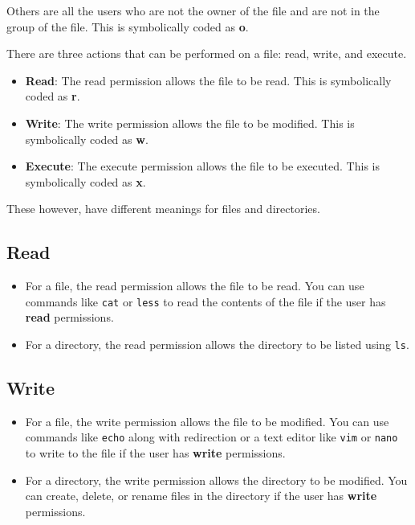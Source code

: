 \begin{definition}[Others]
  Others are all the users who are not the owner of the file and are not in the group of the file.
  This is symbolically coded as \textbf{o}.
\end{definition}

There are three actions that can be performed on a file: read, write, and execute.

\begin{itemize}
  \item \textbf{Read}: The read permission allows the file to be read.
    This is symbolically coded as \textbf{r}.
  \item \textbf{Write}: The write permission allows the file to be modified.
    This is symbolically coded as \textbf{w}.
  \item \textbf{Execute}: The execute permission allows the file to be executed.
    This is symbolically coded as \textbf{x}.
\end{itemize}

These however, have different meanings for files and directories.

\subsection{Read}

\begin{itemize}
  \item For a file, the read permission allows the file to be read.
    You can use commands like \texttt{cat} or \texttt{less} to read the contents of the file if the user has \textbf{read} permissions.
  \item For a directory, the read permission allows the directory to be listed using \texttt{ls}.
\end{itemize}

\subsection{Write}

\begin{itemize}
  \item For a file, the write permission allows the file to be modified.
    You can use commands like \texttt{echo} along with redirection
    or a text editor like \texttt{vim} or \texttt{nano}
      to write to the file if the user has \textbf{write} permissions.
  \item For a directory, the write permission allows the directory to be modified.
    You can create, delete, or rename files in the directory if the user has \textbf{write} permissions.
\end{itemize}

